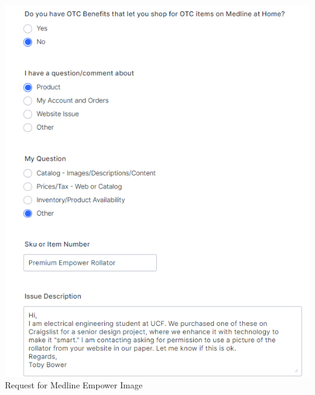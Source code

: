 \begin{center}
\includegraphics[width=\textwidth]{./Images/permit12.png}
\newline Request for Medline Empower Image\\
\end{center}